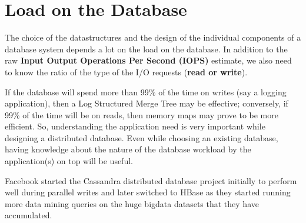\section{Load on the Database}

The choice of the datastructures and the design of the individual components of a database system depends a lot on the load on the database. In addition to the raw \textbf{Input Output Operations Per Second (IOPS)} estimate, we also need to know the ratio of the type of the I/O requests (\textbf{read or write}). 

If the database will spend more than 99\% of the time on writes (say a logging application), then a Log Structured Merge Tree \cite{O_Neil_1996} may be effective; conversely, if 99\% of the time will be on reads, then memory maps may prove to be more efficient. So, understanding the application need is very important while designing a distributed database. Even while choosing an existing database, having knowledge about the nature of the database workload by the application(s) on top will be useful.

Facebook started the Cassandra\cite{Lakshman_2009} distributed database project initially to perform well during parallel writes and later switched to HBase as they started running more data mining queries on the huge bigdata datasets that they have accumulated.
